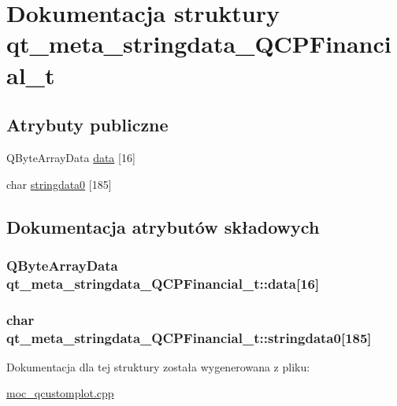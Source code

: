 \hypertarget{structqt__meta__stringdata___q_c_p_financial__t}{}\section{Dokumentacja struktury qt\+\_\+meta\+\_\+stringdata\+\_\+\+Q\+C\+P\+Financial\+\_\+t}
\label{structqt__meta__stringdata___q_c_p_financial__t}
\subsection*{Atrybuty publiczne}
\begin{DoxyCompactItemize}
\item 
Q\+Byte\+Array\+Data \hyperlink{structqt__meta__stringdata___q_c_p_financial__t_a32be9c8341c33d8c6da741702c103986}{data} \mbox{[}16\mbox{]}
\item 
char \hyperlink{structqt__meta__stringdata___q_c_p_financial__t_ad8ba9429514fbfd381c387ad7d4fd8c5}{stringdata0} \mbox{[}185\mbox{]}
\end{DoxyCompactItemize}


\subsection{Dokumentacja atrybutów składowych}
\subsubsection[{\texorpdfstring{data}{data}}]{\setlength{\rightskip}{0pt plus 5cm}Q\+Byte\+Array\+Data qt\+\_\+meta\+\_\+stringdata\+\_\+\+Q\+C\+P\+Financial\+\_\+t\+::data\mbox{[}16\mbox{]}}\hypertarget{structqt__meta__stringdata___q_c_p_financial__t_a32be9c8341c33d8c6da741702c103986}{}\label{structqt__meta__stringdata___q_c_p_financial__t_a32be9c8341c33d8c6da741702c103986}
\subsubsection[{\texorpdfstring{stringdata0}{stringdata0}}]{\setlength{\rightskip}{0pt plus 5cm}char qt\+\_\+meta\+\_\+stringdata\+\_\+\+Q\+C\+P\+Financial\+\_\+t\+::stringdata0\mbox{[}185\mbox{]}}\hypertarget{structqt__meta__stringdata___q_c_p_financial__t_ad8ba9429514fbfd381c387ad7d4fd8c5}{}\label{structqt__meta__stringdata___q_c_p_financial__t_ad8ba9429514fbfd381c387ad7d4fd8c5}


Dokumentacja dla tej struktury została wygenerowana z pliku\+:\begin{DoxyCompactItemize}
\item 
\hyperlink{moc__qcustomplot_8cpp}{moc\+\_\+qcustomplot.\+cpp}\end{DoxyCompactItemize}
